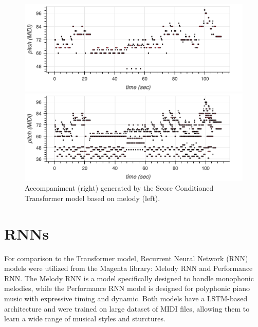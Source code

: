 \documentclass[twocolumn]{article}
\begin{document}
\begin{figure}[htbp]
  \centering
  \begin{minipage}[t]{0.45\columnwidth}
    \centering
    \includegraphics[width=\linewidth]{images/avril_melody.png}
  \end{minipage}\hfill
  \begin{minipage}[t]{0.45\columnwidth}
    \centering
    \includegraphics[width=\linewidth]{images/avril_acc.png}
  \end{minipage}
  \caption{Accompaniment (right) generated by the Score Conditioned Transformer model based on melody (left).}
  \label{fig:groupedImages2}
\end{figure}

\section{RNNs}
For comparison to the Transformer model, Recurrent Neural Network (RNN) models were utilized from the Magenta library: Melody RNN and Performance RNN. The Melody RNN is a model specifically designed to handle monophonic melodies, while the Performance RNN model is designed for polyphonic piano music with expressive timing and dynamic. Both models have a LSTM-based architecture and were trained on large dataset of MIDI files, allowing them to learn a wide range of musical styles and sturctures.
\end{document}
